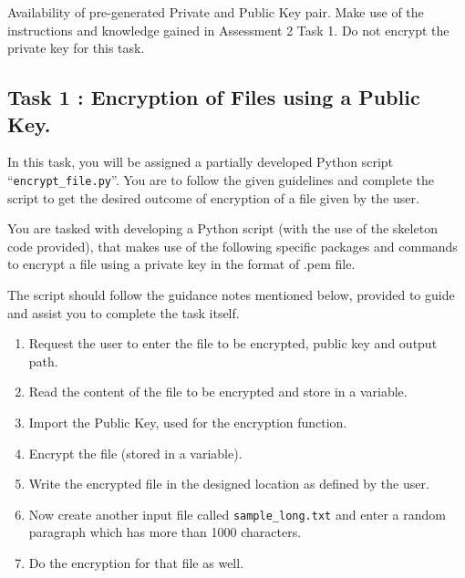\documentclass[11pt,letterpaper]{article}
\begin{document}
\noindent Availability of pre-generated Private and Public Key pair. Make use of the instructions and knowledge gained in Assessment 2 Task 1. Do not encrypt the private key for this task. 

\subsection*{Task 1 : Encryption of Files using a Public Key.}

In this task, you will be assigned a partially developed Python script ``\texttt{encrypt\_file.py}''. You are to follow the given guidelines and complete the script to get the desired outcome of encryption of a file given by the user.

\medskip
\noindent You are tasked with developing a Python script (with the use of the skeleton code provided), that makes use of the following specific packages and commands to encrypt a file using a private key in the format of .pem file.

\medskip
\noindent The script should follow the guidance notes mentioned below, provided to guide and assist you to complete the task itself. 

\begin{enumerate}
    \item Request the user to enter the file to be encrypted, public key and output path. 
    \item Read the content of the file to be encrypted and store in a variable.
    \item Import the Public Key, used for the encryption function.
    \item Encrypt the file (stored in a variable).
    \item Write the encrypted file in the designed location as defined by the user.
    \item Now create another input file called \texttt{sample\_long.txt} and enter a random paragraph which has more than 1000 characters.
    \item Do the encryption for that file as well.
\end{enumerate}

\newpage
\end{document}
